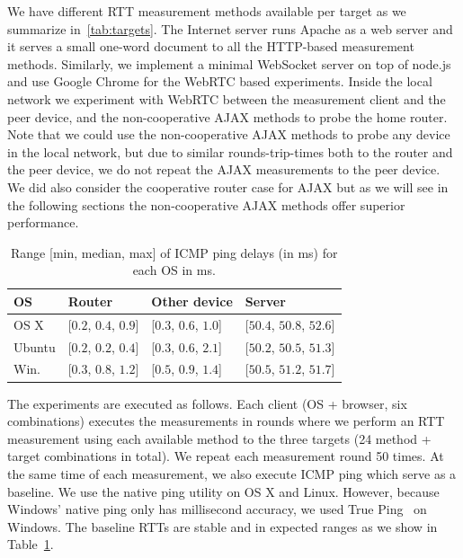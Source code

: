 \documentclass{sig-alternate-10pt}
\begin{document}
We have different RTT measurement methods available per target as we summarize in~\autoref{tab:targets}. 
The Internet server runs Apache as a web server and it serves a small one-word document to all the HTTP-based measurement methods. Similarly, we implement a minimal WebSocket server on top of node.js~\cite{node.js_node.js_2016} and use Google Chrome for the WebRTC based experiments. 
Inside the local network we experiment with WebRTC between the measurement client and the peer device, and the non-cooperative AJAX methods to probe the home router. Note that we could use the non-cooperative AJAX methods to probe any device in the local network, but due to similar rounds-trip-times both to the router and the peer device, we do not repeat the AJAX measurements to the peer device. We did also consider the cooperative router case for AJAX but as we will see in the following sections the non-cooperative AJAX methods offer superior performance. %

\begin{table}[tbh]
\centering
\begin{small}
\begin{tabular}{llll}
\toprule
OS & Router & Other device & Server \\
\midrule
OS X & {[$0.2$, $0.4$, $0.9$]} & {[$0.3$, $0.6$, $1.0$]} & {[$50.4$, $50.8$, $52.6$]}\\
Ubuntu & {[$0.2$, $0.2$, $0.4$]} & {[$0.3$, $0.6$, $2.1$]} & {[$50.2$, $50.5$, $51.3$]}\\
Win. & {[$0.3$, $0.8$, $1.2$]} & {[$0.5$, $0.9$, $1.4$]} & {[$50.5$, $51.2$, $51.7$]}\\
\bottomrule
\end{tabular}
\end{small}
\caption {Range [min, median, max] of ICMP ping delays (in ms) for each OS in ms.} 
\label{tab:ping_range}
\end{table}

The experiments are executed as follows. Each client (OS + browser, six combinations) executes the measurements in rounds where we perform an RTT measurement using each available method to the three targets (24 method + target combinations in total). We repeat each measurement round 50 times. At the same time of each measurement, we also execute ICMP ping which serve as a baseline. We use the native ping utility on OS X and Linux. However, because Windows' native ping only has millisecond accuracy, we used True Ping~\cite{andrea_denzler_true_2006} on Windows. The baseline RTTs are stable and in expected ranges as we show in Table~\ref{tab:ping_range}.
\end{document}

